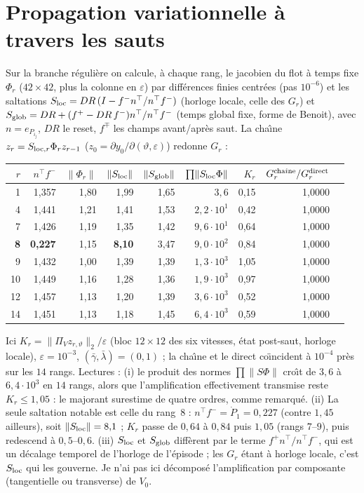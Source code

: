 \documentclass[11pt,a4paper]{article}
\theoremstyle{remark}
\newcommand{\norm}[1]{\lVert #1\rVert}
\newcommand{\vth}{\vartheta}
\begin{document}
\section{Propagation variationnelle \`a travers les sauts}
Sur la branche r\'eguli\`ere on calcule, \`a chaque rang, le jacobien du flot \`a temps fixe $\Phi_r$ ($42\times42$, plus la colonne en $\varepsilon$) par diff\'erences finies centr\'ees (pas $10^{-6}$) et les saltations $S_{\rm loc}=DR\,(I-f^-n^\top/n^\top f^-)$ (horloge locale, celle des $G_r$) et $S_{\rm glob}=DR+(f^+-DR\,f^-)n^\top/n^\top f^-$ (temps global fixe, forme de Benoit), avec $n=e_{P_{i_j}}$, $DR$ le reset, $f^\mp$ les champs avant/apr\`es saut. La cha\^{\i}ne $z_r=S_{{\rm loc},r}\Phi_rz_{r-1}$ ($z_0=\partial y_0/\partial(\vth,\varepsilon)$) redonne $G_r$ :
\begin{center}\small
\begin{tabular}{r|rrrrrrr|r}
\toprule
$r$ & $n^\top f^-$ & $\lVert\Phi_r\rVert$ & $\lVert S_{\rm loc}\rVert$ & $\lVert S_{\rm glob}\rVert$ & $\prod\lVert S_{\rm loc}\Phi\rVert$ & $K_r$ & $G^{\rm cha\hat\imath ne}_r/G^{\rm direct}_r$\\
\midrule
1 & 1,357 & 1,80 & 1,99 & 1,65 & $3{,}6$ & 0,15 & 1,0000\\
4 & 1,441 & 1,21 & 1,41 & 1,53 & $2{,}2\cdot10^1$ & 0,42 & 1,0000\\
7 & 1,426 & 1,19 & 1,35 & 1,42 & $9{,}6\cdot10^1$ & 0,64 & 1,0000\\
\textbf{8} & \textbf{0,227} & 1,15 & \textbf{8,10} & 3,47 & $9{,}0\cdot10^2$ & 0,84 & 1,0000\\
9 & 1,432 & 1,00 & 1,39 & 1,39 & $1{,}3\cdot10^3$ & 1,05 & 1,0000\\
10 & 1,449 & 1,16 & 1,28 & 1,36 & $1{,}9\cdot10^3$ & 0,97 & 1,0000\\
12 & 1,457 & 1,13 & 1,20 & 1,39 & $3{,}6\cdot10^3$ & 0,52 & 1,0000\\
14 & 1,451 & 1,13 & 1,18 & 1,45 & $6{,}4\cdot10^3$ & 0,59 & 1,0000\\
\bottomrule
\end{tabular}
\end{center}
Ici $K_r=\norm{\Pi_V z_{r,\vth}}_2/\varepsilon$ (bloc $12\times12$ des six vitesses, \'etat post-saut, horloge locale), $\varepsilon=10^{-3}$, $(\bar\gamma,\bar\lambda)=(0,1)$ ; la cha\^{\i}ne et le direct co\"{\i}ncident \`a $10^{-4}$ pr\`es sur les $14$ rangs. Lectures : (i) le produit des normes $\prod\lVert S\Phi\rVert$ cro\^{\i}t de $3{,}6$ \`a $6{,}4\cdot10^3$ en $14$ rangs, alors que l'amplification effectivement transmise reste $K_r\le1{,}05$ : le majorant surestime de quatre ordres, comme remarqu\'e. (ii) La seule saltation notable est celle du rang~8 : $n^\top f^-=\dot P_1=0{,}227$ (contre $1{,}45$ ailleurs), soit $\lVert S_{\rm loc}\rVert=8{,}1$ ; $K_r$ passe de $0{,}64$ \`a $0{,}84$ puis $1{,}05$ (rangs $7$--$9$), puis redescend \`a $0{,}5$--$0{,}6$. (iii) $S_{\rm loc}$ et $S_{\rm glob}$ diff\`erent par le terme $f^+n^\top/n^\top f^-$, qui est un d\'ecalage temporel de l'horloge de l'\'episode ; les $G_r$ \'etant \`a horloge locale, c'est $S_{\rm loc}$ qui les gouverne. Je n'ai pas ici d\'ecompos\'e l'amplification par composante (tangentielle ou transverse) de $V_0$.
\end{document}
